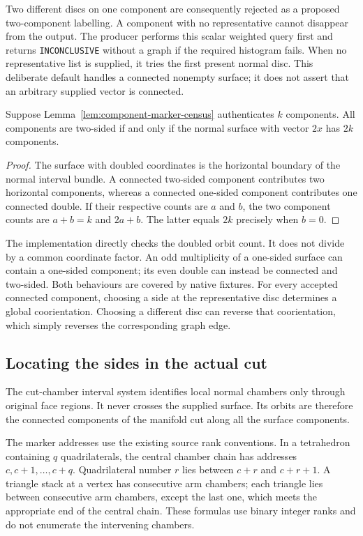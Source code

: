 Two different discs on one component are consequently rejected as a proposed
two-component labelling. A component with no representative cannot disappear
from the output. The producer performs this scalar weighted query first and
returns \texttt{INCONCLUSIVE} without a graph if the required histogram fails.
When no representative list is supplied, it tries the first present normal
disc. This deliberate default handles a connected nonempty surface; it does
not assert that an arbitrary supplied vector is connected.

\begin{lemma}
\label{lem:component-two-sided}
Suppose Lemma~\ref{lem:component-marker-census} authenticates $k$ components.
All components are two-sided if and only if the normal surface with vector
$2x$ has $2k$ components.
\end{lemma}
\begin{proof}
The surface with doubled coordinates is the horizontal boundary of the
normal interval bundle. A connected two-sided component contributes two
horizontal components, whereas a connected one-sided component contributes
one connected double. If their respective counts are $a$ and $b$, the two
component counts are $a+b=k$ and $2a+b$. The latter equals $2k$ precisely
when $b=0$.
\end{proof}

The implementation directly checks the doubled orbit count. It does not
divide by a common coordinate factor. An odd multiplicity of a one-sided
surface can contain a one-sided component; its even double can instead be
connected and two-sided. Both behaviours are covered by native fixtures.
For every accepted connected component, choosing a side at the representative
disc determines a global coorientation. Choosing a different disc can reverse
that coorientation, which simply reverses the corresponding graph edge.

\subsection{Locating the sides in the actual cut}

The cut-chamber interval system identifies local normal chambers only through
original face regions. It never crosses the supplied surface. Its orbits
are therefore the connected components of the manifold cut along all the
surface components.

The marker addresses use the existing source rank conventions. In a
tetrahedron containing $q$ quadrilaterals, the central chamber chain has
addresses $c,c+1,\ldots,c+q$. Quadrilateral number $r$ lies between $c+r$
and $c+r+1$. A triangle stack at a vertex has consecutive arm chambers;
each triangle lies between consecutive arm chambers, except the last one,
which meets the appropriate end of the central chain. These formulas use
binary integer ranks and do not enumerate the intervening chambers.

